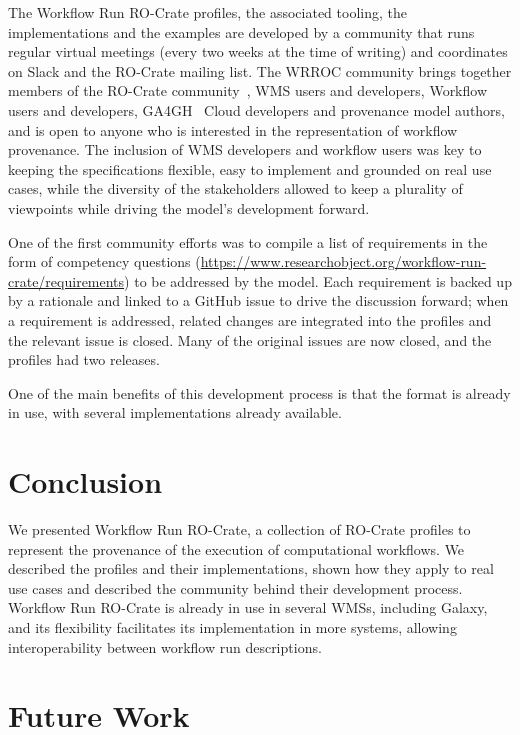 \documentclass[10pt,letterpaper]{article}
\begin{document}
The Workflow Run RO-Crate profiles, the associated tooling, the implementations and the examples are developed by a community that runs regular virtual meetings (every two weeks at the time of writing) and coordinates on Slack and the RO-Crate mailing list.
The WRROC community brings together members of the RO-Crate community~\cite{Soiland-Reyes 2022a}, WMS users and developers, Workflow users and developers, GA4GH~\cite{Rehm 2021} Cloud developers and provenance model authors, and is open to anyone who is interested in the representation of workflow provenance.
The inclusion of WMS developers and workflow users was key to keeping the specifications flexible, easy to implement and grounded on real use cases, while the diversity of the stakeholders allowed to keep a plurality of viewpoints while driving the model's development forward.

One of the first community efforts was to compile a list of requirements in the form of competency questions (\url{https://www.researchobject.org/workflow-run-crate/requirements}) to be addressed by the model.
Each requirement is backed up by a rationale and linked to a GitHub issue to drive the discussion forward;
when a requirement is addressed, related changes are integrated into the profiles and the relevant issue is closed.
Many of the original issues are now closed, and the profiles had two releases.

One of the main benefits of this development process is that the format is already in use, with several implementations already available.

\hypertarget{conclusion}{%
\section{Conclusion}\label{conclusion}}

We presented Workflow Run RO-Crate, a collection of RO-Crate profiles to represent the provenance of the execution of computational workflows.
We described the profiles and their implementations, shown how they apply to real use cases and described the community behind their development process.
Workflow Run RO-Crate is already in use in several WMSs, including Galaxy, and its flexibility facilitates its implementation in more systems, allowing interoperability between workflow run descriptions.

\hypertarget{future-work}{%
\section{Future Work}\label{future-work}}
\end{document}
